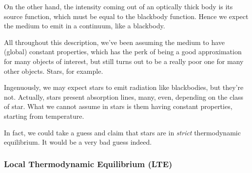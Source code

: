 \par On the other hand, the intensity coming out of an optically thick body is its source function, which must be equal to the blackbody function. Hence we expect the medium to emit in a continuum, like a blackbody.
\par All throughout this description, we've been assuming the medium to have (global) constant properties, which has the perk of being a good approximation for many objects of interest, but still turns out to be a really poor one for many other objects. Stars, for example. 
\par Ingenuously, we may expect stars to emit radiation like blackbodies, but they're not. Actually, stars present absorption lines, many, even, depending on the class of star. What we cannot assume in stars is them having constant properties, starting from temperature.
\par In fact, we could take a guess and claim that stars are in \emph{strict} thermodynamic equilibrium. It would be a very bad guess indeed.

\subsubsection{Local Thermodynamic Equilibrium (LTE)}

